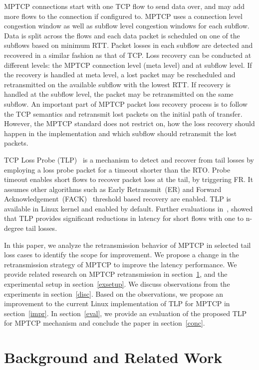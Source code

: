 \documentclass[10pt,conference,compsoc]{IEEEtran}
\begin{document}
 MPTCP connections start with one TCP flow to send data over, and may add more flows to the connection if configured to. MPTCP uses a connection level congestion window as well as subflow level congestion windows for each subflow. Data is split across the flows and each data packet is scheduled on one of the subflows based on minimum RTT. Packet losses in each subflow are detected and recovered in a similar fashion as that of TCP. Loss recovery can be conducted at different levels: the MPTCP connection level (meta level) and at subflow level. If the recovery is handled at meta level, a lost packet may be rescheduled and retransmitted on the available subflow with the lowest RTT. If recovery is handled at the subflow level, the packet may be retransmitted on the same subflow. An important part of MPTCP packet loss recovery process is to follow the TCP semantics and retransmit lost packets on the initial path of transfer. However, the MPTCP standard does not restrict on, how the loss recovery should happen in the implementation and which subflow should retransmit the lost packets.


TCP Loss Probe (TLP)~\cite{Flach:2013} is a mechanism to detect and recover from tail losses by employing a loss probe packet for a timeout shorter than the RTO. Probe timeout enables short flows to recover packet loss at the tail, by triggering FR. It assumes other algorithms such as Early Retransmit~(ER)\cite{rfc5827} and Forward Acknowledgement~(FACK)~\cite{FACK} threshold based recovery are enabled. TLP is available in Linux kernel and enabled by default. Further evaluations in~\cite{Rajiullah:2015}, showed that TLP provides significant reductions in latency for short flows with one to n-degree tail losses. 

In this paper, we analyze the retransmission behavior of MPTCP in selected tail loss cases to identify the scope for improvement. We propose a change in the retransmission strategy of MPTCP to improve the latency performance. We provide related research on MPTCP retransmission in section~\ref{relwork}, and the experimental setup in section~\ref{exsetup}. We discuss observations from the experiments in section~\ref{disc}. Based on the observations, we propose an improvement to the current Linux implementation of TLP for MPTCP in section~\ref{impr}. In section~\ref{eval}, we provide an evaluation of the proposed TLP for MPTCP mechanism and conclude the paper in section~\ref{conc}.
 
\section{Background and Related Work}\label{relwork}
\end{document}
